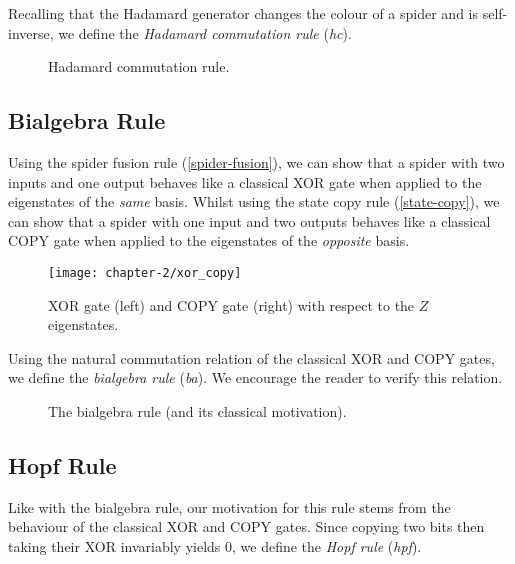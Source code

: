 Recalling that the Hadamard generator changes the colour of a spider and is self-inverse, we define the \textit{Hadamard commutation rule} (\textit{hc}).

\begin{figure}[H]
    \centering
    \caption{Hadamard commutation rule.}
    \label{hadamard-commutation}
\end{figure}


\subsection{Bialgebra Rule}

Using the spider fusion rule (\ref{spider-fusion}), we can show that a spider with two inputs and one output behaves like a classical XOR gate when applied to the eigenstates of the \textit{same} basis. Whilst using the state copy rule (\ref{state-copy}), we can show that a spider with one input and two outputs behaves like a classical COPY gate when applied to the eigenstates of the \textit{opposite} basis.

\begin{figure}[H]
    \centering
    \texttt{[image: chapter-2/xor\_copy]}
    \caption{XOR gate (left) and COPY gate (right) with respect to the $Z$ eigenstates.}
    \label{xor}
    \label{copy}
\end{figure}

Using the natural commutation relation of the classical XOR and COPY gates, we define the \textit{bialgebra rule} (\textit{ba}). We encourage the reader to verify this relation.

\begin{figure}[H]
    \centering
    \caption{The bialgebra rule (and its classical motivation).}
    \label{bialgebra}
\end{figure}


\subsection{Hopf Rule}

Like with the bialgebra rule, our motivation for this rule stems from the behaviour of the classical XOR and COPY gates. Since copying two bits then taking their XOR invariably yields 0, we define the \textit{Hopf rule} (\textit{hpf}).

